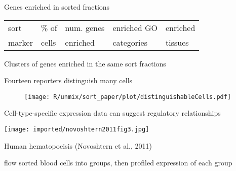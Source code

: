 \documentclass[serif,9pt]{beamer}
\begin{document}
\begin{frame}{Genes enriched in sorted fractions}

\begin{table}\footnotesize
\begin{tabular}{lllll}
sort & \% of & num. genes & enriched GO & enriched \\
marker & cells & enriched & categories & tissues \\
\hline

\end{tabular}
\end{table}

\end{frame}

\begin{frame}{Clusters of genes enriched in the same sort fractions}





\end{frame}



\begin{frame}{Fourteen reporters distinguish many cells}

\begin{figure}
\begin{centering}
\texttt{[image: R/unmix/sort\_paper/plot/distinguishableCells.pdf]}

\end{centering}
\end{figure}

\end{frame}

\begin{frame}{Cell-type-specific expression data can suggest regulatory relationships}

\texttt{[image: imported/novoshtern2011fig3.jpg]}

Human hematopoeisis (Novoshtern et al., 2011)

{\small flow sorted blood cells into groups, then profiled expression of each group}

\end{frame}
\end{document}
